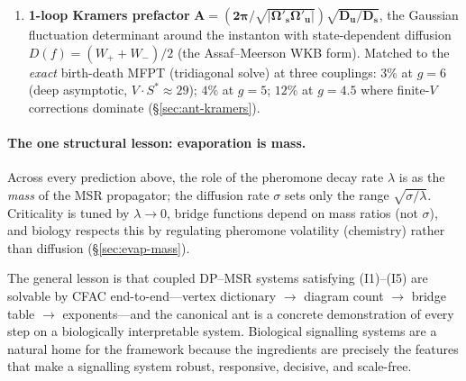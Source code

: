 \documentclass[10pt,a4paper,twocolumn]{article}
\theoremstyle{definition}
\begin{document}
\begin{enumerate}
  \item \textbf{1-loop Kramers prefactor}
    $\boldsymbol{A = (2\pi/\sqrt{|\Omega'_s\Omega'_u|})\sqrt{D_u/D_s}}$,
    the Gaussian fluctuation determinant around the instanton
    with state-dependent diffusion $D(f) = (W_++W_-)/2$ (the
    Assaf--Meerson WKB form).  Matched to the \emph{exact}
    birth-death MFPT (tridiagonal solve) at three couplings:
    $3\%$ at $g=6$ (deep asymptotic, $V\cdot S^* \approx 29$);
    $4\%$ at $g=5$; $12\%$ at $g=4.5$ where finite-$V$
    corrections dominate (\S\ref{sec:ant-kramers}).
\end{enumerate}

\paragraph{The one structural lesson: evaporation is mass.}
Across every prediction above, the role of the pheromone decay
rate $\lambda$ is as the \emph{mass} of the MSR propagator; the
diffusion rate $\sigma$ sets only the range $\sqrt{\sigma/\lambda}$.
Criticality is tuned by $\lambda \to 0$, bridge functions depend
on mass ratios (not $\sigma$), and biology respects this by
regulating pheromone volatility (chemistry) rather than
diffusion (\S\ref{sec:evap-mass}).

The general lesson is that coupled DP--MSR systems satisfying
(I1)--(I5) are solvable by CFAC end-to-end---vertex dictionary
$\to$ diagram count $\to$ bridge table $\to$ exponents---and the
canonical ant is a concrete demonstration of every step on a
biologically interpretable system.  Biological signalling
systems are a natural home for the framework because the
ingredients are precisely the features that make a signalling
system robust, responsive, decisive, and scale-free.
\end{document}
